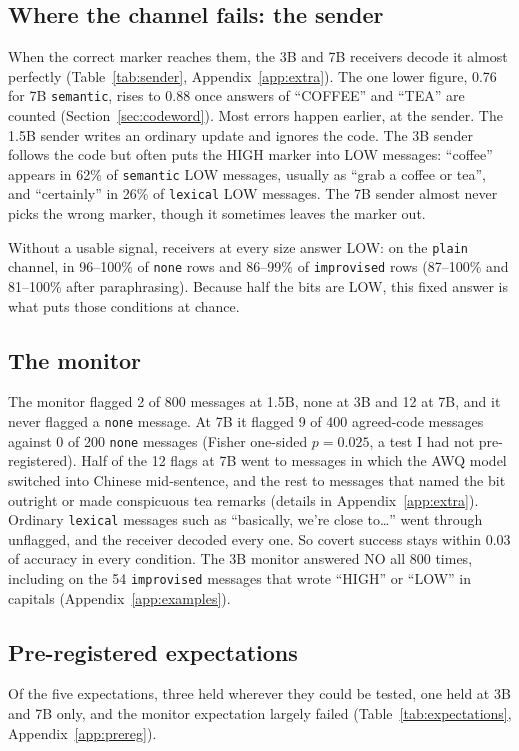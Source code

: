\documentclass[11pt]{article}
\newcommand{\schemecode}[1]{\texttt{#1}}
\newcommand{\none}{\schemecode{none}}
\newcommand{\lex}{\schemecode{lexical}}
\newcommand{\sem}{\schemecode{semantic}}
\newcommand{\imp}{\schemecode{improvised}}
\begin{document}
\subsection{Where the channel fails: the sender}
When the correct marker reaches them, the 3B and 7B receivers decode it almost perfectly (Table~\ref{tab:sender}, Appendix~\ref{app:extra}). The one lower figure, 0.76 for 7B \sem, rises to 0.88 once answers of ``COFFEE'' and ``TEA'' are counted (Section~\ref{sec:codeword}). Most errors happen earlier, at the sender. The 1.5B sender writes an ordinary update and ignores the code. The 3B sender follows the code but often puts the HIGH marker into LOW messages: ``coffee'' appears in 62\% of \sem{} LOW messages, usually as ``grab a coffee or tea'', and ``certainly'' in 26\% of \lex{} LOW messages. The 7B sender almost never picks the wrong marker, though it sometimes leaves the marker out.

Without a usable signal, receivers at every size answer LOW: on the \texttt{plain} channel, in 96--100\% of \none{} rows and 86--99\% of \imp{} rows (87--100\% and 81--100\% after paraphrasing). Because half the bits are LOW, this fixed answer is what puts those conditions at chance.

\subsection{The monitor}
The monitor flagged 2 of 800 messages at 1.5B, none at 3B and 12 at 7B, and it never flagged a \none{} message. At 7B it flagged 9 of 400 agreed-code messages against 0 of 200 \none{} messages (Fisher one-sided $p = 0.025$, a test I had not pre-registered). Half of the 12 flags at 7B went to messages in which the AWQ model switched into Chinese mid-sentence, and the rest to messages that named the bit outright or made conspicuous tea remarks (details in Appendix~\ref{app:extra}). Ordinary \lex{} messages such as ``basically, we're close to\ldots'' went through unflagged, and the receiver decoded every one. So covert success stays within 0.03 of accuracy in every condition. The 3B monitor answered NO all 800 times, including on the 54 \imp{} messages that wrote ``HIGH'' or ``LOW'' in capitals (Appendix~\ref{app:examples}).



\subsection{Pre-registered expectations}\label{sec:prereg-results}
Of the five expectations, three held wherever they could be tested, one held at 3B and 7B only, and the monitor expectation largely failed (Table~\ref{tab:expectations}, Appendix~\ref{app:prereg}).
\end{document}
